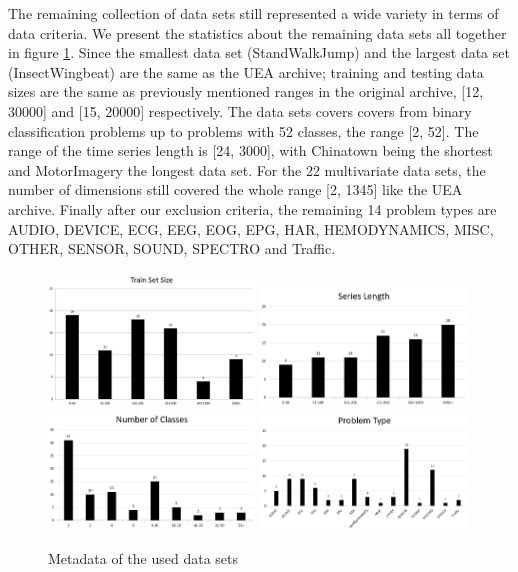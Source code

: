 The remaining collection of data sets still represented a wide variety in terms of data criteria.
We present the statistics about the remaining data sets all together in figure \ref{fig:DatasetsMetadata}.
Since the smallest data set (StandWalkJump) and the largest data set (InsectWingbeat) are the same as the UEA archive; training and testing data sizes are the same as previously mentioned ranges in the original archive, [12, 30000] and [15, 20000] respectively.
The data sets covers covers from binary classification problems up to problems with 52 classes, the range [2, 52].
The range of the time series length is [24, 3000], with Chinatown being the shortest and MotorImagery the longest data set.
For the 22 multivariate data sets, the number of dimensions still covered the whole range [2, 1345] like the UEA archive.
Finally after our exclusion criteria, the remaining 14 problem types are AUDIO, DEVICE, ECG, EEG, EOG, EPG, HAR, HEMODYNAMICS, MISC, OTHER, SENSOR, SOUND, SPECTRO and Traffic.

\begin{figure}
    \captionsetup{justification=raggedright}
    \includegraphics[width=0.49\textwidth,keepaspectratio]{Train_size_hist.JPG}
    \includegraphics[width=0.49\textwidth,keepaspectratio]{Length_hist.JPG}
    \\[\smallskipamount]
    \includegraphics[width=0.49\textwidth,keepaspectratio]{Classes_hist.JPG}
    \includegraphics[width=0.49\textwidth,keepaspectratio]{Problem_hist.JPG}
    \caption{Metadata of the used data sets}
    \label{fig:DatasetsMetadata}
\end{figure}

